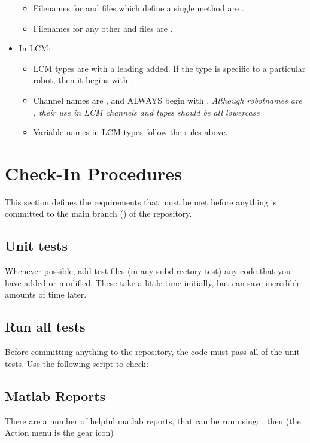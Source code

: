 \begin{itemize}
\begin{itemize}
\item Filenames for  and  files which define a single method are .  
\item Filenames for any other  and  files are .
\end{itemize}
\item In LCM:
\begin{itemize}
\item LCM types are  with a leading  added. If the type is specific to a particular robot, then it begins with .
\item Channel names are , and ALWAYS begin with . 
  \emph{Although robotnames are , their use in LCM channels and types should be all lowercase}
\item Variable names in LCM types follow the rules above.
\end{itemize}
\end{itemize}


\section{Check-In Procedures}

This section defines the requirements that must be met before anything 
is committed to the main branch () of the \drake repository.

\subsection{Unit tests}

  Whenever possible, add test files (in any subdirectory test) any code 
  that you have added or modified.  These take a little time initially, 
  but can save incredible amounts of time later.

\subsection{Run all tests}

  Before committing anything to the repository, the code must pass all of 
  the unit tests.  Use the following script to check:

\subsection{Matlab Reports}
  There are a number of helpful matlab reports, that can be run using: 
    ,
  then 
      (the Action menu is the gear icon)

